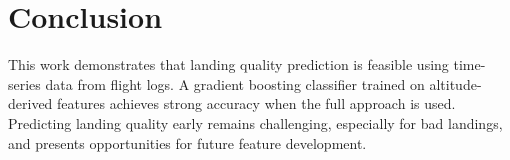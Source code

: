 \documentclass[conference]{IEEEtran}
\begin{document}
\section{Conclusion}
This work demonstrates that landing quality prediction is feasible using time-series data from flight logs. A gradient boosting classifier trained on altitude-derived features achieves strong accuracy when the full approach is used. Predicting landing quality early remains challenging, especially for bad landings, and presents opportunities for future feature development.



\end{document}
